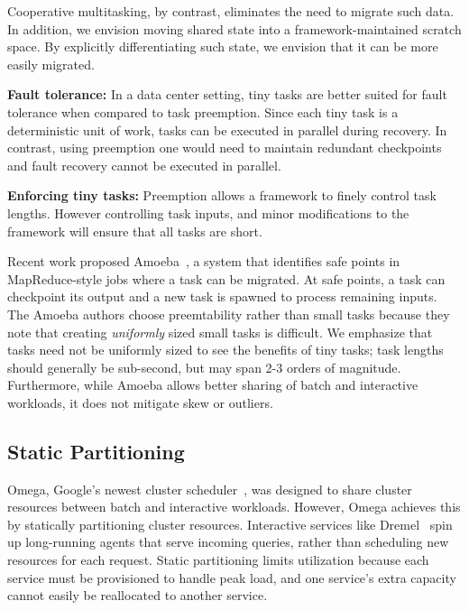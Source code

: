 Cooperative multitasking, by contrast, eliminates the need to migrate such data. In
addition, we envision moving shared state into a framework-maintained scratch space.
By explicitly differentiating such state, we envision that it can be more easily migrated.

\vspace{4pt}\noindent\textbf{Fault tolerance:}
In a data center setting, tiny tasks are better suited for
fault tolerance when compared to task preemption. Since each tiny task is a
deterministic unit of work, tasks can be executed in parallel during recovery.
In contrast, using preemption one would need to maintain redundant checkpoints
and fault recovery cannot be executed in parallel.

\vspace{4pt}\noindent\textbf{Enforcing tiny tasks:}
Preemption allows a framework to finely control
task lengths. However controlling task inputs, and minor modifications to the
framework will ensure that all tasks are short.

Recent work proposed Amoeba~\cite{ananthanarayanan2012true}, a system that identifies safe points in MapReduce-style
jobs where a task can be migrated. At safe points, a task can checkpoint its
output and a new task is spawned to process remaining inputs. The Amoeba authors
choose preemtability rather than small tasks because they note that creating
\emph{uniformly} sized small tasks is difficult. We emphasize that tasks need
not be uniformly sized to see the benefits of tiny tasks; task lengths
should generally be sub-second, but may span 2-3 orders of magnitude.
Furthermore, while Amoeba allows better sharing of batch and interactive
workloads, it does not mitigate skew or outliers.

\subsection{Static Partitioning}
Omega, Google's newest cluster scheduler~\cite{melnik2010dremel},
was designed to share cluster
resources between batch and interactive workloads. However, Omega achieves
this by
statically partitioning cluster resources.
Interactive services like Dremel~\cite{melnik2010dremel} spin up long-running
agents that serve incoming queries, rather than scheduling new resources for
each request.  Static partitioning limits utilization because each service
must be provisioned to handle peak load, and one service's extra capacity
cannot easily be reallocated to another service.

